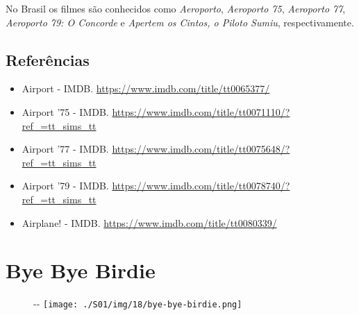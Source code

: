 No Brasil os filmes são conhecidos como \emph{Aeroporto},
\emph{Aeroporto 75}, \emph{Aeroporto 77}, \emph{Aeroporto 79: O
Concorde} e \emph{Apertem os Cintos, o Piloto Sumiu}, respectivamente.

\hypertarget{referuxeancias-14}{%
\subsection{Referências}\label{referuxeancias-14}}

\begin{itemize}
\tightlist
\item
  \sloppy Airport - IMDB. \url{https://www.imdb.com/title/tt0065377/}
\item
  \sloppy Airport ’75 - IMDB. \url{https://www.imdb.com/title/tt0071110/?ref_=tt_sims_tt}
\item
  \sloppy Airport ’77 - IMDB. \url{https://www.imdb.com/title/tt0075648/?ref_=tt_sims_tt}
\item
  \sloppy Airport ’79 - IMDB. \url{https://www.imdb.com/title/tt0078740/?ref_=tt_sims_tt}
\item
  \sloppy Airplane! - IMDB. \url{https://www.imdb.com/title/tt0080339/}
\end{itemize}

\hypertarget{bye-bye-birdie}{%
\section{Bye Bye Birdie}\label{bye-bye-birdie}}

\begin{figure}[!ht]
  \begin{adjustwidth}{-\oddsidemargin-1in}{-\rightmargin}
    \centering
    \texttt{[image: ./S01/img/18/bye-bye-birdie.png]}
  \end{adjustwidth}
\end{figure}

